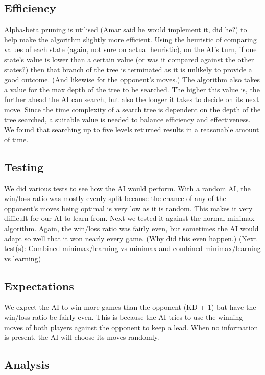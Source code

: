 \documentclass[11pt]{article}
\begin{document}
\subsection{Efficiency}
\label{sec-2-3}

Alpha-beta pruning is utilised (Amar said he would implement it, did he?) to help make the algorithm slightly more efficient. Using the heuristic of comparing values of each state (again, not sure on actual heuristic), on the AI’s turn, if one state’s value is lower than a certain value (or was it compared against the other states?) then that branch of the tree is terminated as it is unlikely to provide a good outcome. (And likewise for the opponent’s moves.)
The algorithm also takes a value for the max depth of the tree to be searched. The higher this value is, the further ahead the AI can search, but also the longer it takes to decide on its next move. Since the time complexity of a search tree is dependent on the depth of the tree searched, a suitable value is needed to balance efficiency and effectiveness. We found that searching up to five levels returned results in a reasonable amount of time.
\subsection{Testing}
\label{sec-2-4}

We did various tests to see how the AI would perform. With a random AI, the win/loss ratio was mostly evenly split because the chance of any of the opponent's moves being optimal is very low as it is random. This makes it very difficult for our AI to learn from.
Next we tested it against the normal minimax algorithm. Again, the win/loss ratio was fairly even, but sometimes the AI would adapt so well that it won nearly every game. (Why did this even happen.)
(Next test(s): Combined minimax/learning  vs  minimax and combined minimax/learning vs learning)
\subsection{Expectations}
\label{sec-2-5}

We expect the AI to win more games than the opponent (KD + 1) but have the win/loss ratio be fairly even. This is because the AI tries to use the winning moves of both players against the opponent to keep a lead. When no information is present, the AI will choose its moves randomly.
\subsection{Analysis}
\label{sec-2-6}
\end{document}
